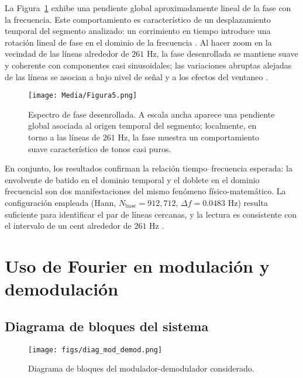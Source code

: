 \documentclass[letter,12pt]{article}
\begin{document}
La Figura~\ref{fig:exp1-phase} exhibe una pendiente global aproximadamente lineal de la fase con la frecuencia. Este comportamiento es característico de un desplazamiento temporal del segmento analizado: un corrimiento en tiempo introduce una rotación lineal de fase en el dominio de la frecuencia \cite{OppenheimSchaferDTSP3e,VetterliKovacevicGoyalFSP2014}. Al hacer zoom en la vecindad de las líneas alrededor de \(261\) Hz, la fase desenrollada se mantiene suave y coherente con componentes casi sinusoidales; las variaciones abruptas alejadas de las líneas se asocian a bajo nivel de señal y a los efectos del ventaneo \cite{OppenheimSchaferDTSP3e}.
\begin{figure}[H]
  \centering
  \texttt{[image: Media/Figura5.png]}
  \caption{Espectro de fase desenrollada. A escala ancha aparece una pendiente global asociada al origen temporal del segmento; localmente, en torno a las líneas de \(261\) Hz, la fase muestra un comportamiento suave característico de tonos casi puros.}
  \label{fig:exp1-phase}
\end{figure}  

En conjunto, los resultados confirman la relación tiempo–frecuencia esperada: la envolvente de batido en el dominio temporal y el doblete en el dominio frecuencial son dos manifestaciones del mismo fenómeno físico-matemático. La configuración empleada (Hann, \(N_{\text{base}}=912{,}712\), \(\Delta f=0.0483\) Hz) resulta suficiente para identificar el par de líneas cercanas, y la lectura es consistente con el intervalo de un cent alrededor de \(261\) Hz \cite{OppenheimSchaferDTSP3e,Harris1978Windows}.



\section{Uso de Fourier en modulación y demodulación}
\subsection{Diagrama de bloques del sistema}
\begin{figure}[H]
  \centering
  \texttt{[image: figs/diag\_mod\_demod.png]} %
  \caption{Diagrama de bloques del modulador-demodulador considerado.}
  \label{fig:bloques-mod-demod}
\end{figure}
\end{document}
